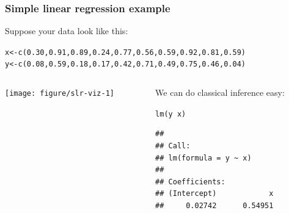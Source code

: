 \documentclass[color=usenames,dvipsnames]{beamer}\usepackage[]{graphicx}\usepackage[]{color}
\makeatletter
\newcommand{\hlnum}[1]{\textcolor[rgb]{0.69,0.494,0}{#1}}%
\newcommand{\hlopt}[1]{\textcolor[rgb]{0,0,0}{#1}}%
\newcommand{\hlstd}[1]{\textcolor[rgb]{0,0,0}{#1}}%
\newcommand{\hlkwb}[1]{\textcolor[rgb]{0,0.341,0.682}{#1}}%
\newcommand{\hlkwd}[1]{\textcolor[rgb]{0.004,0.004,0.506}{#1}}%
\newenvironment{kframe}{%
 \def\at@end@of@kframe{}%
 \ifinner\ifhmode%
  \def\at@end@of@kframe{\end{minipage}}%
  \begin{minipage}{\columnwidth}%
 \fi\fi%
 \def\FrameCommand##1{\hskip\@totalleftmargin \hskip-\fboxsep
 \colorbox{shadecolor}{##1}\hskip-\fboxsep
     \hskip-\linewidth \hskip-\@totalleftmargin \hskip\columnwidth}%
 \MakeFramed {\advance\hsize-\width
   \@totalleftmargin\z@ \linewidth\hsize
   \@setminipage}}%
 {\par\unskip\endMakeFramed%
 \at@end@of@kframe}
\newenvironment{knitrout}{}{} %
\makeatother
\begin{document}
\begin{frame}[fragile]
  \frametitle{Simple linear regression example}
  Suppose your data look like this:
\begin{knitrout}\scriptsize
{}\color{fgcolor}\begin{kframe}
\begin{alltt}
\hlstd{x} \hlkwb{<-} \hlkwd{c}\hlstd{(}\hlnum{0.30}\hlstd{,} \hlnum{0.91}\hlstd{,} \hlnum{0.89}\hlstd{,} \hlnum{0.24}\hlstd{,} \hlnum{0.77}\hlstd{,} \hlnum{0.56}\hlstd{,} \hlnum{0.59}\hlstd{,} \hlnum{0.92}\hlstd{,} \hlnum{0.81}\hlstd{,} \hlnum{0.59}\hlstd{)}
\hlstd{y} \hlkwb{<-} \hlkwd{c}\hlstd{(}\hlnum{0.08}\hlstd{,} \hlnum{0.59}\hlstd{,} \hlnum{0.18}\hlstd{,} \hlnum{0.17}\hlstd{,} \hlnum{0.42}\hlstd{,} \hlnum{0.71}\hlstd{,} \hlnum{0.49}\hlstd{,} \hlnum{0.75}\hlstd{,} \hlnum{0.46}\hlstd{,} \hlnum{0.04}\hlstd{)}
\end{alltt}
\end{kframe}
\end{knitrout}
\begin{columns}
  \begin{column}{0.5\textwidth}
\begin{knitrout}
\color{fgcolor}
\texttt{[image: figure/slr-viz-1]} 
\end{knitrout}
  \end{column}
  \pause
  \begin{column}{0.5\textwidth}
    We can do classical inference easy:
\begin{knitrout}\scriptsize
{}\color{fgcolor}\begin{kframe}
\begin{alltt}
\hlkwd{lm}\hlstd{(y}\hlopt{~}\hlstd{x)}
\end{alltt}
\begin{verbatim}
## 
## Call:
## lm(formula = y ~ x)
## 
## Coefficients:
## (Intercept)            x  
##     0.02742      0.54951
\end{verbatim}
\end{kframe}
\end{knitrout}
  \end{column}
\end{columns}
\end{frame}
\end{document}
